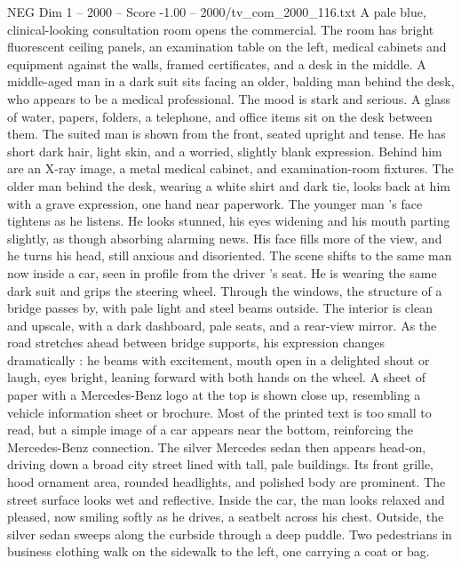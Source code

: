 \begin{textsample}{NEG Dim 1 – 2000 – Score -1.00 – 2000/tv\_com\_2000\_116.txt}  \label{ex:f1_neg_063}
A pale blue, clinical-looking consultation room opens the commercial.
The room has bright fluorescent ceiling panels, an examination table on the left, medical cabinets and equipment against the walls, framed certificates, and a desk in the middle.
A middle-aged man in a dark suit sits facing an older, balding man behind the desk, who appears to be a medical professional.
The mood is stark and serious.
A glass of water, papers, folders, a telephone, and office items sit on the desk between them.
The suited man is shown from the front, seated upright and tense.
He has short dark hair, light skin, and a worried, slightly blank expression.
Behind him are an X-ray image, a metal medical cabinet, and examination-room fixtures.
The older man behind the desk, wearing a white shirt and dark tie, looks back at him with a grave expression, one hand near paperwork.
The younger man ’s face tightens as he listens.
He looks stunned, his eyes widening and his mouth parting slightly, as though absorbing alarming news.
His face fills more of the view, and he turns his head, still anxious and disoriented.
The scene shifts to the same man now inside a car, seen in profile from the driver ’s seat.
He is wearing the same dark suit and grips the steering wheel.
Through the windows, the structure of a bridge passes by, with pale light and steel beams outside.
The interior is clean and upscale, with a dark dashboard, pale seats, and a rear-view mirror.
As the road stretches ahead between bridge supports, his expression changes dramatically : he beams with excitement, mouth open in a delighted shout or laugh, eyes bright, leaning forward with both hands on the wheel.
A sheet of paper with a Mercedes-Benz logo at the top is shown close up, resembling a vehicle information sheet or brochure.
Most of the printed text is too small to read, but a simple image of a car appears near the bottom, reinforcing the Mercedes-Benz connection.
The silver Mercedes sedan then appears head-on, driving down a broad city street lined with tall, pale buildings.
Its front grille, hood ornament area, rounded headlights, and polished body are prominent.
The street surface looks wet and reflective.
Inside the car, the man looks relaxed and pleased, now smiling softly as he drives, a seatbelt across his chest.
Outside, the silver sedan sweeps along the curbside through a deep puddle.
Two pedestrians in business clothing walk on the sidewalk to the left, one carrying a coat or bag.

\end{textsample}
